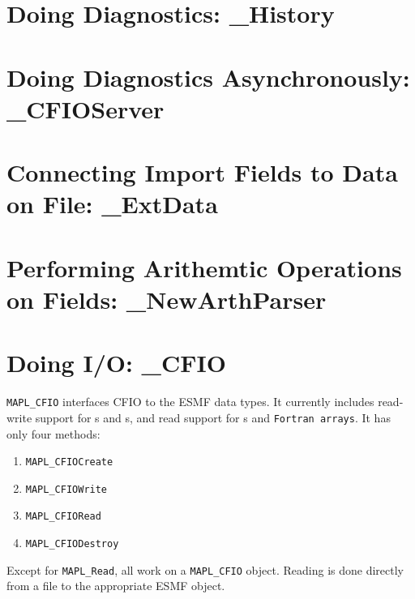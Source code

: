 \section{Doing Diagnostics: \ggn\_History}



\section{Doing Diagnostics Asynchronously: \ggn\_CFIOServer}




\section{Connecting Import Fields to Data on File: \ggn\_ExtData}




\section{Performing Arithemtic Operations on Fields: \ggn\_NewArthParser}




\section{Doing I/O: \ggn\_CFIO}

{\tt MAPL\_CFIO}  interfaces CFIO to the ESMF data types.
It currently includes read-write support for \fld s and \stt s,
and read support for \fld s and \texttt{Fortran arrays}.
It has only four methods:
\begin{enumerate}
\item \texttt{MAPL\_CFIOCreate}
\item \texttt{MAPL\_CFIOWrite}
\item \texttt{MAPL\_CFIORead}
\item \texttt{MAPL\_CFIODestroy}
\end{enumerate}
Except for \texttt{MAPL\_Read}, all work on a \texttt{MAPL\_CFIO} object.
Reading is done directly from a file to the appropriate ESMF object.


